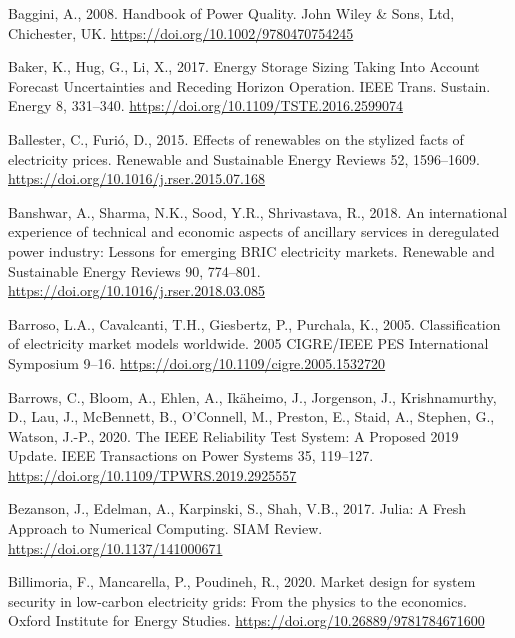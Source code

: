 \documentclass[12pt,a4paper,]{report}
\newlength{\cslhangindent}
\newenvironment{CSLReferences}[2] %
 {%
  \setlength{\parindent}{0pt}
  \ifodd #1 \everypar{\setlength{\hangindent}{\cslhangindent}}\ignorespaces\fi
  \ifnum #2 > 0
  \setlength{\parskip}{#2\baselineskip}
  \fi
 }%
 {}
\begin{document}
\begin{CSLReferences}{1}{0}
\leavevmode{}%
Baggini, A., 2008. Handbook of {Power Quality}. {John Wiley \& Sons,
Ltd}, {Chichester, UK}. \url{https://doi.org/10.1002/9780470754245}

\leavevmode{}%
Baker, K., Hug, G., Li, X., 2017. Energy {Storage Sizing Taking Into
Account Forecast Uncertainties} and {Receding Horizon Operation}. IEEE
Trans. Sustain. Energy 8, 331--340.
\url{https://doi.org/10.1109/TSTE.2016.2599074}

\leavevmode{}%
Ballester, C., Furió, D., 2015. Effects of renewables on the stylized
facts of electricity prices. Renewable and Sustainable Energy Reviews
52, 1596--1609. \url{https://doi.org/10.1016/j.rser.2015.07.168}

\leavevmode{}%
Banshwar, A., Sharma, N.K., Sood, Y.R., Shrivastava, R., 2018. An
international experience of technical and economic aspects of ancillary
services in deregulated power industry: {Lessons} for emerging {BRIC}
electricity markets. Renewable and Sustainable Energy Reviews 90,
774--801. \url{https://doi.org/10.1016/j.rser.2018.03.085}

\leavevmode{}%
Barroso, L.A., Cavalcanti, T.H., Giesbertz, P., Purchala, K., 2005.
Classification of electricity market models worldwide. 2005 CIGRE/IEEE
PES International Symposium 9--16.
\url{https://doi.org/10.1109/cigre.2005.1532720}

\leavevmode{}%
Barrows, C., Bloom, A., Ehlen, A., Ikäheimo, J., Jorgenson, J.,
Krishnamurthy, D., Lau, J., McBennett, B., O'Connell, M., Preston, E.,
Staid, A., Stephen, G., Watson, J.-P., 2020. The {IEEE Reliability Test
System}: {A Proposed} 2019 {Update}. IEEE Transactions on Power Systems
35, 119--127. \url{https://doi.org/10.1109/TPWRS.2019.2925557}

\leavevmode{}%
Bezanson, J., Edelman, A., Karpinski, S., Shah, V.B., 2017. Julia: {A
Fresh Approach} to {Numerical Computing}. SIAM Review.
\url{https://doi.org/10.1137/141000671}

\leavevmode{}%
Billimoria, F., Mancarella, P., Poudineh, R., 2020. Market design for
system security in low-carbon electricity grids: From the physics to the
economics. {Oxford Institute for Energy Studies}.
\url{https://doi.org/10.26889/9781784671600}


\end{CSLReferences}
\end{document}

